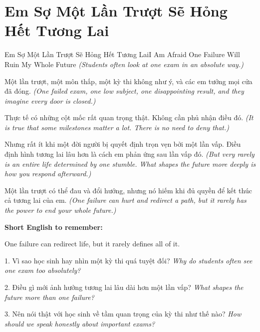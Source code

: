 \section{Em Sợ Một Lần Trượt Sẽ Hỏng Hết Tương Lai}
\begin{truyen}{Em Sợ Một Lần Trượt Sẽ Hỏng Hết Tương Lai}{I Am Afraid One Failure Will Ruin My Whole Future}
\textit{(Students often look at one exam in an absolute way.)}

Một lần trượt, một môn thấp, một kỳ thi không như ý, và các em tưởng mọi cửa đã đóng.
\textit{(One failed exam, one low subject, one disappointing result, and they imagine every door is closed.)}

Thực tế có những cột mốc rất quan trọng thật. Không cần phủ nhận điều đó.
\textit{(It is true that some milestones matter a lot. There is no need to deny that.)}

Nhưng rất ít khi một đời người bị quyết định trọn vẹn bởi một lần vấp. Điều định hình tương lai lâu hơn là cách em phản ứng sau lần vấp đó.
\textit{(But very rarely is an entire life determined by one stumble. What shapes the future more deeply is how you respond afterward.)}
\end{truyen}

\begin{baihoc}
Một lần trượt có thể đau và đổi hướng, nhưng nó hiếm khi đủ quyền để kết thúc cả tương lai của em.
\textit{(One failure can hurt and redirect a path, but it rarely has the power to end your whole future.)}
\end{baihoc}

\begin{ghinhoanh}
\textbf{Short English to remember:}

One failure can redirect life, but it rarely defines all of it.

\end{ghinhoanh}

\begin{tuhocnhanh}
1. Vì sao học sinh hay nhìn một kỳ thi quá tuyệt đối? \textit{Why do students often see one exam too absolutely?}

2. Điều gì mới ảnh hưởng tương lai lâu dài hơn một lần vấp? \textit{What shapes the future more than one failure?}

3. Nên nói thật với học sinh về tầm quan trọng của kỳ thi như thế nào? \textit{How should we speak honestly about important exams?}
\end{tuhocnhanh}
\ngancach

